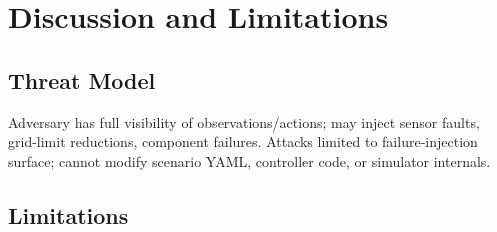 \documentclass[11pt,a4paper]{article}
\begin{document}
\section{Discussion and Limitations}
\label{sec:discussion}

\subsection{Threat Model}
Adversary has full visibility of observations/actions; may inject sensor faults,
grid-limit reductions, component failures. Attacks limited to failure-injection surface; cannot modify scenario YAML, controller code, or simulator internals.

\subsection{Limitations}
\label{sec:limitations}
\end{document}

